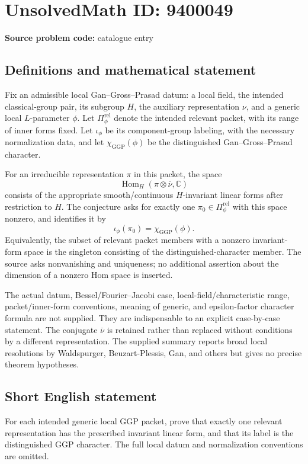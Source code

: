 \documentclass[11pt]{article}
\begin{document}
\section*{UnsolvedMath ID: 9400049}
\textbf{Source problem code:} catalogue entry
\subsection{Definitions and mathematical statement}
Fix an admissible local Gan--Gross--Prasad datum: a local field, the intended classical-group pair, its subgroup $H$, the auxiliary representation $\nu$, and a generic local $L$-parameter $\phi$. Let $\Pi_\phi^{\mathrm{rel}}$ denote the intended relevant packet, with its range of inner forms fixed. Let $\iota_\phi$ be its component-group labeling, with the necessary normalization data, and let $\chi_{\mathrm{GGP}}(\phi)$ be the distinguished Gan--Gross--Prasad character.

For an irreducible representation $\pi$ in this packet, the space
\[
\operatorname{Hom}_H(\pi\otimes\overline\nu,\mathbb C)
\]
consists of the appropriate smooth/continuous $H$-invariant linear forms after restriction to $H$. The conjecture asks for exactly one $\pi_0\in\Pi_\phi^{\mathrm{rel}}$ with this space nonzero, and identifies it by
\[
\iota_\phi(\pi_0)=\chi_{\mathrm{GGP}}(\phi).
\]
Equivalently, the subset of relevant packet members with a nonzero invariant-form space is the singleton consisting of the distinguished-character member. The source asks nonvanishing and uniqueness; no additional assertion about the dimension of a nonzero Hom space is inserted.

The actual datum, Bessel/Fourier--Jacobi case, local-field/characteristic range, packet/inner-form conventions, meaning of generic, and epsilon-factor character formula are not supplied. They are indispensable to an explicit case-by-case statement. The conjugate $\overline\nu$ is retained rather than replaced without conditions by a different representation. The supplied summary reports broad local resolutions by Waldspurger, Beuzart-Plessis, Gan, and others but gives no precise theorem hypotheses.
\subsection{Short English statement}
For each intended generic local GGP packet, prove that exactly one relevant representation has the prescribed invariant linear form, and that its label is the distinguished GGP character. The full local datum and normalization conventions are omitted.
\end{document}
